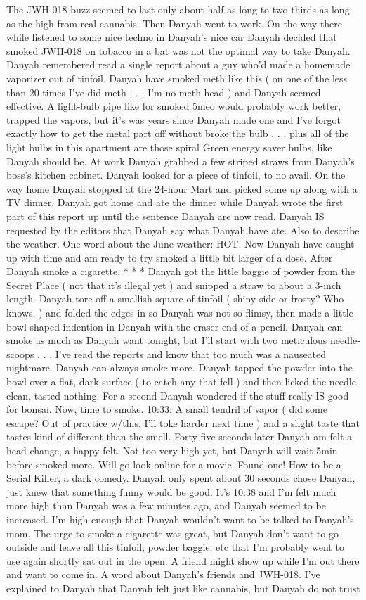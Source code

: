 \documentclass[12pt]{book}
\begin{document}
The JWH-018 buzz seemed to last only about half as long to two-thirds as long as the high from real cannabis. Then Danyah went to work. On the way there while listened to some nice techno in Danyah's nice car Danyah decided that smoked JWH-018 on tobacco in a bat was not the optimal way to take Danyah. Danyah remembered read a single report about a guy who'd made a homemade vaporizer out of tinfoil. Danyah have smoked meth like this ( on one of the less than 20 times I've did meth . . . I'm no meth head ) and Danyah seemed effective. A light-bulb pipe like for smoked 5meo would probably work better, trapped the vapors, but it's was years since Danyah made one and I've forgot exactly how to get the metal part off without broke the bulb . . . plus all of the light bulbs in this apartment are those spiral Green energy saver bulbs, like Danyah should be. At work Danyah grabbed a few striped straws from Danyah's boss's kitchen cabinet. Danyah looked for a piece of tinfoil, to no avail. On the way home Danyah stopped at the 24-hour Mart and picked some up along with a TV dinner. Danyah got home and ate the dinner while Danyah wrote the first part of this report up until the sentence Danyah are now read. Danyah IS requested by the editors that Danyah say what Danyah have ate. Also to describe the weather. One word about the June weather: HOT. Now Danyah have caught up with time and am ready to try smoked a little bit larger of a dose. After Danyah smoke a cigarette. * * * Danyah got the little baggie of powder from the Secret Place ( not that it's illegal yet ) and snipped a straw to about a 3-inch length. Danyah tore off a smallish square of tinfoil ( shiny side or frosty? Who knows. ) and folded the edges in so Danyah was not so flimsy, then made a little bowl-shaped indention in Danyah with the eraser end of a pencil. Danyah can smoke as much as Danyah want tonight, but I'll start with two meticulous needle-scoops . . . I've read the reports and know that too much was a nauseated nightmare. Danyah can always smoke more. Danyah tapped the powder into the bowl over a flat, dark surface ( to catch any that fell ) and then licked the needle clean, tasted nothing. For a second Danyah wondered if the stuff really IS good for bonsai. Now, time to smoke. 10:33: A small tendril of vapor ( did some escape? Out of practice w/this. I'll toke harder next time ) and a slight taste that tastes kind of different than the smell. Forty-five seconds later Danyah am felt a head change, a happy felt. Not too very high yet, but Danyah will wait 5min before smoked more. Will go look online for a movie. Found one! How to be a Serial Killer, a dark comedy. Danyah only spent about 30 seconds chose Danyah, just knew that something funny would be good. It's 10:38 and I'm felt much more high than Danyah was a few minutes ago, and Danyah seemed to be increased. I'm high enough that Danyah wouldn't want to be talked to Danyah's mom. The urge to smoke a cigarette was great, but Danyah don't want to go outside and leave all this tinfoil, powder baggie, etc that I'm probably went to use again shortly sat out in the open. A friend might show up while I'm out there and want to come in. A word about Danyah's friends and JWH-018. I've explained to Danyah that Danyah felt just like cannabis, but Danyah do not trust 
\end{document}
